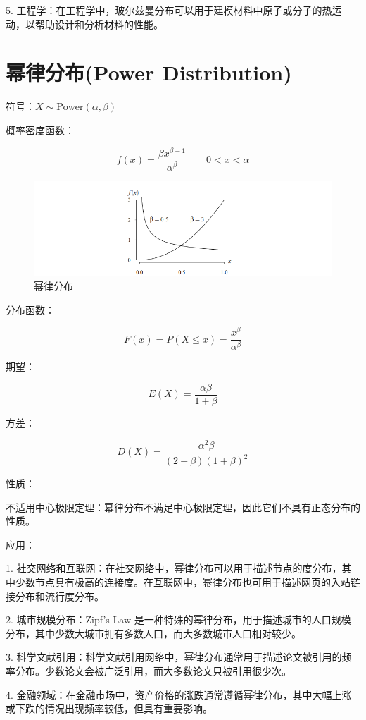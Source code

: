 \documentclass[12pt, a4paper, oneside]{ctexbook}
\begin{document}
5. 工程学：在工程学中，玻尔兹曼分布可以用于建模材料中原子或分子的热运动，以帮助设计和分析材料的性能。

\section{幂律分布(Power Distribution)}

 符号：$X\sim \text{Power}(\alpha, \beta)$

 概率密度函数：

$$
f(x) = \dfrac{\beta x^{\beta - 1}}{\alpha^{\beta}} \quad \quad 0 < x < \alpha
$$

\begin{figure}[H]
  \centering
  \includegraphics[width=1\textwidth]{image/幂律分布.png}
  \caption{幂律分布}
  \label{fig:example}
\end{figure}

 分布函数：

$$
F(x) = P(X \leq x) = \dfrac{x^{\beta}}{\alpha^{\beta}}
$$

 期望：

$$
E(X) = \dfrac{\alpha \beta}{1 + \beta}
$$

 方差：

$$
D(X) = \dfrac{\alpha^{2}\beta}{(2 + \beta)(1 + \beta)^{2}}
$$

 性质：

不适用中心极限定理：幂律分布不满足中心极限定理，因此它们不具有正态分布的性质。

 应用：

1. 社交网络和互联网：在社交网络中，幂律分布可以用于描述节点的度分布，其中少数节点具有极高的连接度。在互联网中，幂律分布也可用于描述网页的入站链接分布和流行度分布。

2. 城市规模分布：Zipf's Law 是一种特殊的幂律分布，用于描述城市的人口规模分布，其中少数大城市拥有多数人口，而大多数城市人口相对较少。

3. 科学文献引用：科学文献引用网络中，幂律分布通常用于描述论文被引用的频率分布。少数论文会被广泛引用，而大多数论文只被引用很少次。

4. 金融领域：在金融市场中，资产价格的涨跌通常遵循幂律分布，其中大幅上涨或下跌的情况出现频率较低，但具有重要影响。
\end{document}
